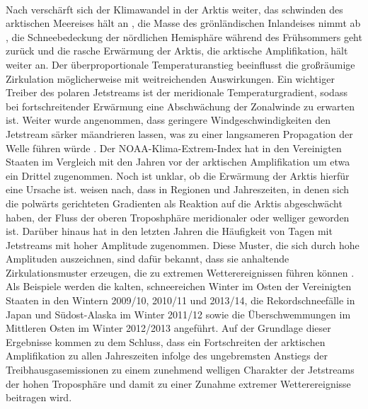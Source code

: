 \citet{francis-2015}\\
Nach \citet{francis-2015} verschärft sich der Klimawandel in der Arktis weiter, das schwinden des arktischen Meereises hält an \citep{}, die Masse des grönländischen Inlandeises nimmt ab \citep{}, die Schneebedeckung der nördlichen Hemisphäre während des Frühsommers geht zurück und die rasche Erwärmung der Arktis, die arktische Amplifikation, hält weiter an. Der überproportionale Temperaturanstieg beeinflusst die großräumige Zirkulation möglicherweise mit weitreichenden Auswirkungen. Ein wichtiger Treiber des polaren Jetstreams ist der meridionale Temperaturgradient, sodass bei fortschreitender Erwärmung eine Abschwächung der Zonalwinde zu erwarten ist. Weiter wurde angenommen, dass geringere Windgeschwindigkeiten den Jetstream särker mäandrieren lassen, was zu einer langsameren Propagation der Welle führen würde \citep{}. Der NOAA-Klima-Extrem-Index hat in den Vereinigten Staaten im Vergleich mit den Jahren vor der arktischen Amplifikation um etwa ein Drittel zugenommen. Noch ist unklar, ob die Erwärmung der Arktis hierfür eine Ursache ist. \citet{francis-2015} weisen nach, dass in Regionen und Jahreszeiten, in denen sich die polwärts gerichteten Gradienten als Reaktion auf die Arktis abgeschwächt haben, der Fluss der oberen Troposhphäre meridionaler oder welliger geworden ist. Darüber hinaus hat in den letzten Jahren die Häufigkeit von Tagen mit  Jetstreams mit hoher Amplitude zugenommen. Diese Muster, die sich durch hohe Amplituden auszeichnen, sind dafür bekannt, dass sie anhaltende Zirkulationsmuster erzeugen, die zu extremen Wetterereignissen führen können \citep{} \citep{}. Als Beispiele werden die kalten, schneereichen Winter im Osten der Vereinigten Staaten in den Wintern 2009/10, 2010/11 und 2013/14, die Rekordschneefälle in Japan und Südost-Alaska im Winter 2011/12 sowie die Überschwemmungen im Mittleren Osten im Winter 2012/2013 angeführt. Auf der Grundlage dieser Ergebnisse kommen \citet{francis-2015} zu dem Schluss, dass ein Fortschreiten der arktischen Amplifikation zu allen Jahreszeiten infolge des ungebremsten Anstiegs der Treibhausgasemissionen zu einem zunehmend welligen Charakter der Jetstreams der hohen Troposphäre und damit zu einer Zunahme extremer Wetterereignisse beitragen wird.

